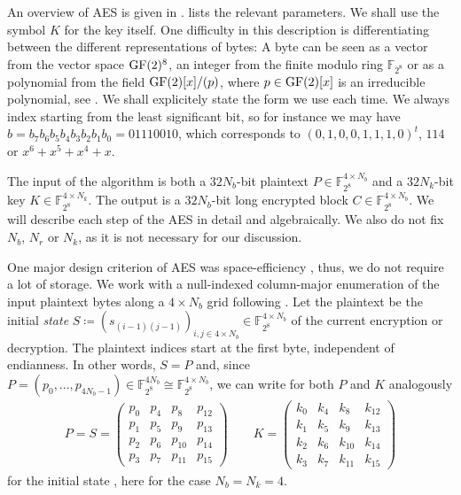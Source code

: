 An overview of AES is given in .  lists the relevant parameters. We shall use the symbol \(K\) for the key itself. One difficulty in this description is differentiating between the different representations of bytes: A byte can be seen as a vector from the vector space \(\operatorname{GF}(2)^8\), an integer from the finite modulo ring \(\mathbb{F}_{2^8}\) or as a polynomial from the field \(\operatorname{GF}(2)[x]/(p)\), where \(p \in \operatorname{GF}(2)[x]\) is an irreducible polynomial, see . We shall explicitely state the form we use each time. We always index starting from the least significant bit, so for instance we may have \(b = b_7b_6b_5b_4b_3b_2b_1b_0 = 01110010\), which corresponds to \((0, 1, 0, 0, 1, 1, 1, 0)^t\), \(114\) or \(x^6+x^5+x^4+x\).

The input of the algorithm is both a \(32N_b\)-bit plaintext \(P \in \mathbb{F}_{2^8}^{4 \times N_b}\) and a \(32N_k\)-bit key \(K \in \mathbb{F}_{2^8}^{4 \times N_k}\). The output is a \(32N_b\)-bit long encrypted block \(C \in \mathbb{F}_{2^8}^{4 \times N_b}\). We will describe each step of the AES in detail and algebraically. We also do not fix \(N_b\), \(N_r\) or \(N_k\), as it is not necessary for our discussion.

One major design criterion of AES was space-efficiency \cite[pp. 4-5]{Daemen_2020}, thus, we do not require a lot of storage. We work with a null-indexed column-major enumeration of the input plaintext bytes along a \(4 \times N_b\) grid following \cite[p. 9]{Dworkin2001}. Let the plaintext be the initial \emph{state} \(S \coloneqq (s_{(i-1)(j-1)})_{i, j \in 4 \times N_b} \in \mathbb{F}_{2^8}^{4 \times N_b}\) of the current encryption or decryption. The plaintext indices start at the first byte, independent of endianness. In other words, \(S = P\) and, since \(P = (p_0, ..., p_{4N_b-1}) \in \mathbb{F}_{2^8}^{4N_b} \cong \mathbb{F}_{2^8}^{4 \times N_b}\), we can write for both \(P\) and \(K\) analogously
\begin{align}
    P = S = \begin{pmatrix}
        p_{ 0} & p_{ 4} & p_{ 8} & p_{12}\\
        p_{ 1} & p_{ 5} & p_{ 9} & p_{13}\\
        p_{ 2} & p_{ 6} & p_{10} & p_{14}\\
        p_{ 3} & p_{ 7} & p_{11} & p_{15}
    \end{pmatrix} \qquad K = \begin{pmatrix}
        k_{ 0} & k_{ 4} & k_{ 8} & k_{12}\\
        k_{ 1} & k_{ 5} & k_{ 9} & k_{13}\\
        k_{ 2} & k_{ 6} & k_{10} & k_{14}\\
        k_{ 3} & k_{ 7} & k_{11} & k_{15}
    \end{pmatrix}
\end{align}
for the initial state \cite[p. 33]{Daemen_2020}, here for the case \(N_b = N_k = 4\).

